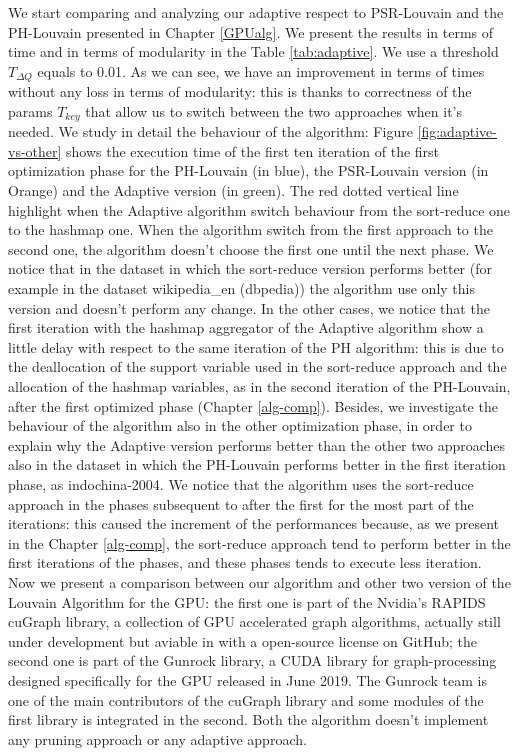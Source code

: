 We start comparing and analyzing our adaptive respect to PSR-Louvain and the PH-Louvain presented in Chapter \ref{GPUalg}. We present the results in terms of time and in terms of modularity in the Table \ref{tab:adaptive}. We use a threshold $T_{\Delta Q}$ equals to 0.01. As we can see, we have an improvement in terms of times without any loss in terms of modularity: this is thanks to correctness of the params $T_{key}$ that allow us to switch between the two approaches when it's needed. 
We study in detail the behaviour of the algorithm: Figure \ref{fig:adaptive-vs-other} shows the execution time of the first ten iteration of the first optimization phase for the PH-Louvain (in blue), the PSR-Louvain version (in Orange) and the Adaptive version (in green). The red dotted vertical line highlight when the Adaptive algorithm switch behaviour from the sort-reduce one to the hashmap one. When the algorithm switch from the first approach to the second one, the algorithm doesn't choose the first one until the next phase. We notice that in the dataset in which the sort-reduce version performs better (for example in the dataset wikipedia\_en (dbpedia)) the algorithm use only this version and doesn't perform any change. In the other cases, we notice that the first iteration with the hashmap aggregator of the Adaptive algorithm show a little delay with respect to the same iteration of the PH algorithm: this is due to the deallocation of the support variable used in the sort-reduce approach and the allocation of the hashmap variables, as in the second iteration of the PH-Louvain, after the first optimized phase (Chapter \ref{alg-comp}). Besides, we investigate the behaviour of the algorithm also in the other optimization phase, in order to explain why the Adaptive version performs better than the other two approaches also in the dataset in which the PH-Louvain performs better in the first iteration phase, as indochina-2004. We notice that the algorithm uses the sort-reduce approach in the phases subsequent to after the first for the most part of the iterations: this caused the increment of the performances because, as we present in the Chapter \ref{alg-comp},  the sort-reduce approach tend to perform better in the first iterations of the phases, and these phases tends to execute less iteration.\\
Now we present a comparison between our algorithm and other two version of the Louvain Algorithm for the GPU: the first one is part of the Nvidia's RAPIDS cuGraph library,  a collection of GPU accelerated graph algorithms, actually still under development but aviable in  with a open-source license on GitHub; the second one is part of the Gunrock library, a CUDA  library for graph-processing designed specifically for the GPU released in June 2019. The Gunrock team is one of the main contributors of the cuGraph library and some modules of the first library is integrated in the second. Both the algorithm doesn't implement any pruning approach or any adaptive approach.

